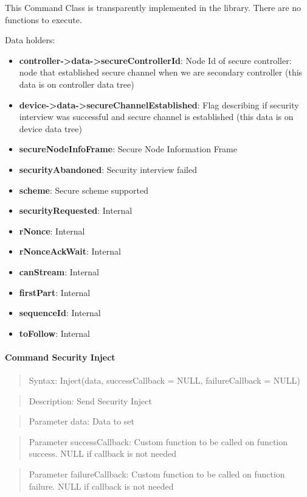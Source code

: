 This Command Class is transparently implemented in the library. There are no functions to execute.
\newline

\noindent
Data holders:

\begin{itemize}
\item \textbf{controller->data->secureControllerId}: Node Id of secure controller: node that established secure channel when we are secondary controller (this data is on controller data tree)
\item \textbf{device->data->secureChannelEstablished}: Flag describing if security interview was successful and secure channel is established (this data is on device data tree)
\item \textbf{secureNodeInfoFrame}: Secure Node Information Frame
\item \textbf{securityAbandoned}: Security interview failed
\item \textbf{scheme}: Secure scheme supported
\item \textbf{securityRequested}: Internal
\item \textbf{rNonce}: Internal
\item \textbf{rNonceAckWait}: Internal
\item \textbf{canStream}: Internal
\item \textbf{firstPart}: Internal
\item \textbf{sequenceId}: Internal
\item \textbf{toFollow}: Internal
\end{itemize}

\paragraph{Command Security Inject}
\begin{quote}Syntax: Inject(data, successCallback = NULL, failureCallback = NULL)\end{quote}
\begin{quote}Description: Send Security Inject\end{quote}
\begin{quote}Parameter data: Data to set\end{quote}
\begin{quote}Parameter successCallback: Custom function to be called on function success. NULL if callback is not needed\end{quote}
\begin{quote}Parameter failureCallback: Custom function to be called on function failure. NULL if callback is not needed\end{quote}



